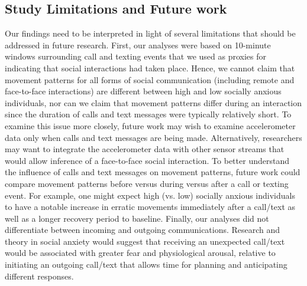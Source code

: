 
\subsection{Study Limitations and Future work}

Our findings need to be interpreted in light of several limitations that should be addressed in future research.  First, our analyses were based on 10-minute windows surrounding call and texting events that we used as proxies for indicating that social interactions had taken place. Hence, we cannot claim that movement patterns for all forms of social communication (including remote and face-to-face interactions) are different between high and low socially anxious individuals, nor can we claim that movement patterns differ during an interaction since the duration of calls and text messages were typically relatively short.  To examine this issue more closely, future work may wish to examine accelerometer data only when calls and text messages are being made.  Alternatively, researchers may want to integrate the accelerometer data with other sensor streams that would allow inference of a face-to-face social interaction.  To better understand the influence of calls and text messages on movement patterns, future work could compare movement patterns before versus during versus after a call or texting event.  For example, one might expect high (vs. low) socially anxious individuals to have a notable increase in erratic movements immediately after a call/text as well as a longer recovery period to baseline.  Finally, our analyses did not differentiate between incoming and outgoing communications.  Research and theory in social anxiety would suggest that receiving an unexpected call/text would be associated with greater fear and physiological arousal, relative to initiating an outgoing call/text that allows time for planning and anticipating different responses.

